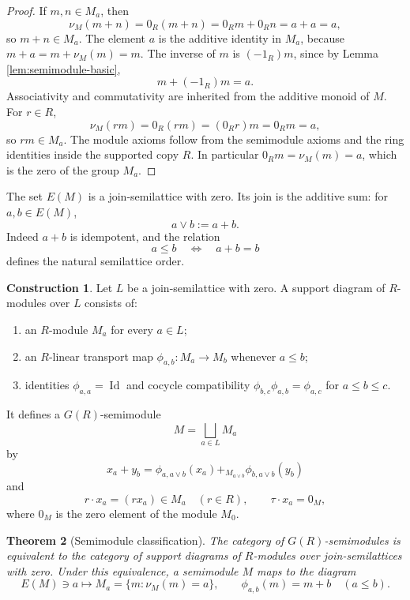 \documentclass[11pt]{article}
\newcommand{\Id}{\operatorname{Id}}
\theoremstyle{plain}
\newtheorem{theorem}{Theorem}[section]
\theoremstyle{definition}
\newtheorem{construction}[theorem]{Construction}
\numberwithin{equation}{section}
\begin{document}
\begin{proof}
If \(m,n\in M_a\), then
\[
 \nu_M(m+n)=0_R(m+n)=0_Rm+0_Rn=a+a=a,
\]
so \(m+n\in M_a\).  The element \(a\) is the additive identity in \(M_a\), because \(m+a=m+\nu_M(m)=m\).  The inverse of \(m\) is \((-1_R)m\), since by Lemma \ref{lem:semimodule-basic},
\[
 m+(-1_R)m=a.
\]
Associativity and commutativity are inherited from the additive monoid of \(M\).  For \(r\in R\),
\[
 \nu_M(rm)=0_R(rm)=(0_Rr)m=0_Rm=a,
\]
so \(rm\in M_a\).  The module axioms follow from the semimodule axioms and the ring identities inside the supported copy \(R\).  In particular \(0_Rm=\nu_M(m)=a\), which is the zero of the group \(M_a\).
\end{proof}

The set \(E(M)\) is a join-semilattice with zero.  Its join is the additive sum: for \(a,b\in E(M)\),
\[
 a\vee b:=a+b.
\]
Indeed \(a+b\) is idempotent, and the relation
\[
 a\le b\quad\Longleftrightarrow\quad a+b=b
\]
defines the natural semilattice order.

\begin{construction}\label{constr:diagram}
Let \(L\) be a join-semilattice with zero.  A support diagram of \(R\)-modules over \(L\) consists of:
\begin{enumerate}[label=(\roman*)]
\item an \(R\)-module \(M_a\) for every \(a\in L\);
\item an \(R\)-linear transport map \(\phi_{a,b}:M_a\to M_b\) whenever \(a\le b\);
\item identities \(\phi_{a,a}=\Id\) and cocycle compatibility \(\phi_{b,c}\phi_{a,b}=\phi_{a,c}\) for \(a\le b\le c\).
\end{enumerate}
It defines a \(G(R)\)-semimodule
\[
 M=\bigsqcup_{a\in L}M_a
\]
by
\[
 x_a+y_b=\phi_{a,a\vee b}(x_a)+_{M_{a\vee b}}\phi_{b,a\vee b}(y_b)
\]
and
\[
 r\cdot x_a=(rx_a)\in M_a\quad(r\in R),
 \qquad
 \tau\cdot x_a=0_M,
\]
where \(0_M\) is the zero element of the module \(M_0\).
\end{construction}

\begin{theorem}[Semimodule classification]\label{thm:semimodule-classification}
The category of \(G(R)\)-semimodules is equivalent to the category of support diagrams of \(R\)-modules over join-semilattices with zero.  Under this equivalence, a semimodule \(M\) maps to the diagram
\[
 E(M)\ni a\longmapsto M_a=\{m:\nu_M(m)=a\},
 \qquad
 \phi_{a,b}(m)=m+b\quad(a\le b).
\]
\end{theorem}
\end{document}
